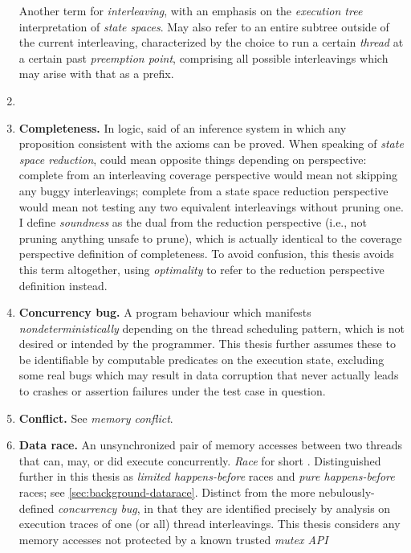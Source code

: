 \begin{enumerate}
		Another term for {\em interleaving}, with an emphasis on the {\em execution tree}
		interpretation of {\em state spaces}.
		May also refer to an entire subtree outside of the current interleaving,
		characterized by the choice to run a certain {\em thread} at a certain past {\em preemption point},
		comprising all possible interleavings which may arise with that as a prefix.
	\item {}
	\item {\bf Completeness.}
		In logic, said of an inference system in which any proposition consistent with the axioms can be proved.
		When speaking of {\em state space reduction},
		could mean opposite things depending on perspective:
		complete from an interleaving coverage perspective would mean not skipping any buggy interleavings;
		complete from a state space reduction perspective would mean not testing any two equivalent interleavings
		without pruning one.
		I define {\em soundness} as the dual from the reduction perspective (i.e., not pruning anything unsafe to prune),
		which is actually identical to the coverage perspective definition of completeness.
		To avoid confusion, this thesis avoids this term altogether,
		using {\em optimality} to refer to the reduction perspective definition instead.
	\item {\bf Concurrency bug.}
		A program behaviour which manifests {\em nondeterministically} depending on the thread scheduling pattern,
		which is not desired or intended by the programmer.
		This thesis further assumes these to be identifiable by computable predicates on the execution state,
		excluding some real bugs which may result in data corruption that never actually leads to crashes or assertion
		failures under the test case in question.
	\item {\bf Conflict.} See {\em memory conflict}.
	\item {\bf Data race.}
		An unsynchronized pair of memory accesses between two threads that can, may, or did execute concurrently.
		{\em Race} for short .
		Distinguished further in this thesis as {\em limited happens-before} races and {\em pure happens-before} races;
		see \cref{sec:background-datarace}.
		Distinct from the more nebulously-defined {\em concurrency bug},
		in that they are identified precisely by analysis on execution traces of one (or all) thread interleavings.
		This thesis considers any memory accesses not protected by a known trusted {\em mutex API}

\end{enumerate}
